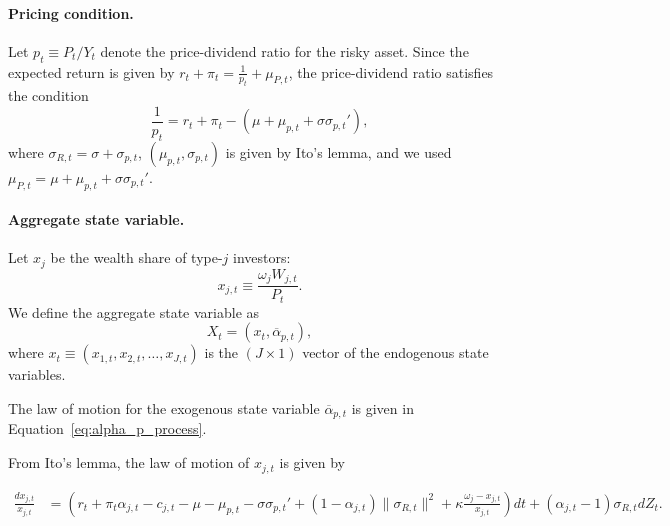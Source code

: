 \documentclass[12pt,english]{article}
\begin{document}
\paragraph{Pricing condition.} Let $p_t \equiv P_t/Y_t$ denote the price-dividend ratio for the risky asset. Since the expected return is given by $r_t + \pi_t = \frac{1}{p_t} + \mu_{P,t}$, the price-dividend ratio satisfies the condition
\begin{equation}\label{eq:pricing_cond}
	\frac{1}{p_t} = r_t + \pi_t  -(\mu + \mu_{p,t} + \sigma \sigma_{p,t}'),
\end{equation}
where $\sigma_{R,t} = \sigma + \sigma_{p,t}$, $(\mu_{p,t}, \sigma_{p,t})$ is given by Ito's lemma, and we used $\mu_{P,t} =\mu + \mu_{p,t} + \sigma \sigma_{p,t}' $.

\paragraph{Aggregate state variable.} Let $x_j$ be the wealth share of type-$j$ investors:
\begin{equation}
	x_{j,t} \equiv \frac{\omega_j W_{j,t}}{P_t}.\nonumber
\end{equation}
We define the aggregate state variable as 
\begin{equation}\label{eq:agg-state-var}
	X_t = (x_t, \overline{\alpha}_{p,t}), 
\end{equation}
where $x_t \equiv \left(x_{1,t}, x_{2,t}, \ldots, x_{J,t}\right )$ is the $(J\times 1)$ vector of the endogenous state variables.

The law of motion for the exogenous state variable $\overline{\alpha}_{p,t}$ is given in Equation~\eqref{eq:alpha_p_process}.


From Ito's lemma, the law of motion of $x_{j,t}$ is given by
\begin{small}
	\begin{align*}
		\frac{d x_{j,t}}{x_{j,t}} &= \left( r_t + \pi_t \alpha_{j,t} - c_{j,t} -\mu - \mu_{p,t} - \sigma \sigma_{p,t}'  +(1- \alpha_{j,t}) \|\sigma_{R,t}\|^2  +\kappa \frac{\omega_j-x_{j,t}}{x_{j,t}}  \right) dt + \left (\alpha_{j,t} - 1\right ) \sigma_{R,t} d Z_t.
	\end{align*}
\end{small}
\end{document}
